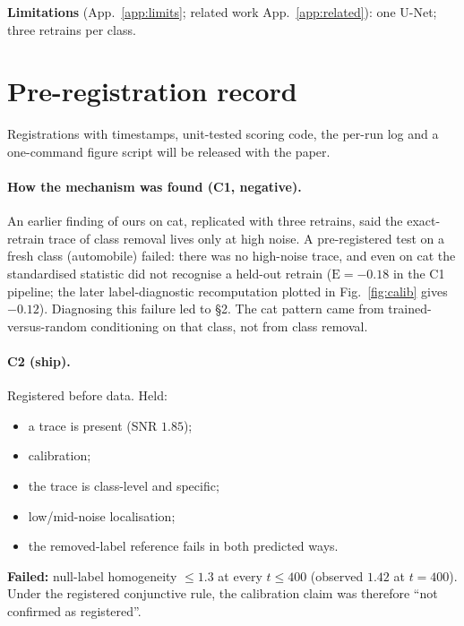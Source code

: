 \documentclass[10pt]{article}
\newcommand{\E}{\mathrm{E}}
\begin{document}
\textbf{Limitations} (App.~\ref{app:limits}; related work App.~\ref{app:related}): one U-Net; three retrains per class.



\appendix
\section{Pre-registration record}\label{app:prereg}
Registrations with timestamps, unit-tested scoring code, the per-run log and a one-command figure script will be released with the paper.
\paragraph{How the mechanism was found (C1, negative).}
An earlier finding of ours on cat, replicated with three retrains, said the exact-retrain trace of class removal lives only at high noise. A pre-registered test on a fresh class (automobile) failed: there was no high-noise trace, and even on cat the standardised statistic did not recognise a held-out retrain ($\E=-0.18$ in the C1 pipeline; the later label-diagnostic recomputation plotted in Fig.~\ref{fig:calib} gives $-0.12$). Diagnosing this failure led to \S2. The cat pattern came from trained-versus-random conditioning on that class, not from class removal.

\paragraph{C2 (ship).} Registered before data. Held:
\begin{itemize}
\item a trace is present (SNR $1.85$);
\item calibration;
\item the trace is class-level and specific;
\item low/mid-noise localisation;
\item the removed-label reference fails in both predicted ways.
\end{itemize}
\textbf{Failed:} null-label homogeneity $\le1.3$ at every $t\le400$ (observed $1.42$ at $t=400$). Under the registered conjunctive rule, the calibration claim was therefore ``not confirmed as registered''.
\end{document}
